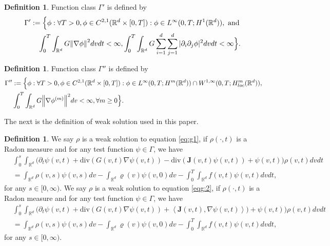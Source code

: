 \documentclass[a4paper, 11pt]{article}
\newcommand{\inner}[2]{\left< #1 , #2 \right>}
\newcounter{results}[section]
\theoremstyle{plain}
\theoremstyle{remark}
\theoremstyle{definition}
\newtheorem{definition}[results]{Definition}
\renewcommand{\div}{\mathrm{div}}
\newcommand{\intd}{\int_{\mathbb{R}^d}}
\newcommand{\intt}{\int_0^T}
\newcommand{\J}{\boldsymbol{J}}
\begin{document}
\begin{definition} 		
Function class $\Gamma'$ is defined by
\begin{equation}
	\begin{aligned}
		\Gamma'&:=\Big\{\phi:\forall T>0, \phi\in C^{2,1}(\mathbb{R}^d\times [0,T]): \phi\in  L^{\infty}(0,T;H^1(\mathbb{R}^d)),\text{ and }\\
		&\quad \intt\intd G\norm{\nabla\phi}^2dvdt<\infty, \intt\intd G\sum_{i=1}^d\sum_{j=1}^d|\partial_i\partial_j\phi|^2dvdt<\infty\Big\}.
	\end{aligned}
\end{equation}
\end{definition}
\begin{definition}Function class $\Gamma''$ is defined by
    \begin{equation}
	\begin{aligned}
		\Gamma''&:=\Big\{\phi: \forall T>0, \phi\in C^{2,1}(\mathbb{R}^d\times [0,T]): \phi\in  L^{\infty}(0,T;H^m(\mathbb{R}^d))\cap W^{1,\infty}(0,T;H^m_{loc}(\mathbb{R}^d)),\\
        &\intt\intd G\norm{\nabla\phi^{(m)}}^2dv<\infty, \forall m\geq 0\Big\}.
	\end{aligned}
\end{equation}
\end{definition}



        
The next is the definition of weak solution used in this paper.
\begin{definition}
    We say $\rho$ is a weak solution to equation \eqref{eq:g1}, if $\rho(\cdot,t)$ is a Radon measure and for any test function $\psi\in \Gamma$, we have
    \begin{equation}
        \begin{aligned}     &\int_0^{s}\intd\Big(\partial_t\psi(v,t)+\div(G(v,t)\nabla\psi(v,t))-\div({\J(v,t)}{\psi(v,t)})+\psi(v,t)\Big)\rho(v,t)dvdt\\
            &=\intd\rho(v,s)\psi(v,s)dv-\intd\varrho(v)\psi(v,0)dv-\intt\intd f(v,t)\psi(v,t)dvdt,
        \end{aligned}
    \end{equation}
    for any $s\in [0,\infty)$. We say $\rho$ is a weak solution to equation \eqref{eqg:2}, if $\rho(\cdot,t)$ is a Radon measure and for any test function $\psi\in \Gamma$, we have
    \begin{equation}
        \begin{aligned}
&\int_0^{s}\intd\Big(\partial_t\psi(v,t)+\div(G(v,t)\nabla\psi(v,t))+\inner{\J(v,t)}{\nabla\psi(v,t)})+\psi(v,t)\Big)\rho(v,t)dvdt\\
            &=\intd\rho(v,s)\psi(v,s)dv-\intd\varrho(v)\psi(v,0)dv-\intt\intd f(v,t)\psi(v,t)dvdt,
        \end{aligned}
    \end{equation}
    for any $s\in [0,\infty)$.
\end{definition}
\end{document}
